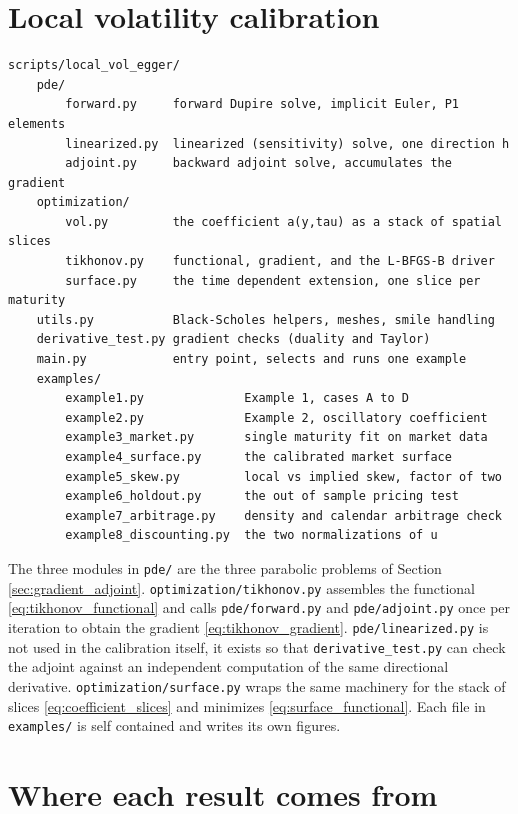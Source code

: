 \section{Local volatility calibration}
\label{subsec:code_local_vol}

\begin{verbatim}
scripts/local_vol_egger/
    pde/
        forward.py     forward Dupire solve, implicit Euler, P1 elements
        linearized.py  linearized (sensitivity) solve, one direction h
        adjoint.py     backward adjoint solve, accumulates the gradient
    optimization/
        vol.py         the coefficient a(y,tau) as a stack of spatial slices
        tikhonov.py    functional, gradient, and the L-BFGS-B driver
        surface.py     the time dependent extension, one slice per maturity
    utils.py           Black-Scholes helpers, meshes, smile handling
    derivative_test.py gradient checks (duality and Taylor)
    main.py            entry point, selects and runs one example
    examples/
        example1.py              Example 1, cases A to D
        example2.py              Example 2, oscillatory coefficient
        example3_market.py       single maturity fit on market data
        example4_surface.py      the calibrated market surface
        example5_skew.py         local vs implied skew, factor of two
        example6_holdout.py      the out of sample pricing test
        example7_arbitrage.py    density and calendar arbitrage check
        example8_discounting.py  the two normalizations of u
\end{verbatim}

The three modules in \texttt{pde/} are the three parabolic problems of
Section \ref{sec:gradient_adjoint}.
\texttt{optimization/tikhonov.py} assembles the functional \eqref{eq:tikhonov_functional} and
calls \texttt{pde/forward.py} and \texttt{pde/adjoint.py} once per iteration to obtain the
gradient \eqref{eq:tikhonov_gradient}.
\texttt{pde/linearized.py} is not used in the calibration itself,
it exists so that \texttt{derivative\_test.py} can check the adjoint against an independent
computation of the same directional derivative.
\texttt{optimization/surface.py} wraps the same machinery for the stack of slices
\eqref{eq:coefficient_slices} and minimizes \eqref{eq:surface_functional}.
Each file in \texttt{examples/} is self contained and writes its own figures.

\section{Where each result comes from}
\label{subsec:code_results_map}


